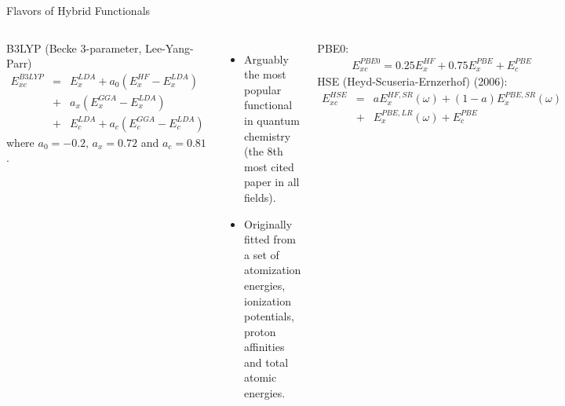 \documentclass[aspectratio=169]{beamer}
\begin{document}
    \begin{frame}{Flavors of Hybrid Functionals}
        \begin{columns}
            B3LYP (Becke 3-parameter, Lee-Yang-Parr)\cite{beckeDensityFunctionalThermochemistry1993}
            \begin{eqnarray*}
                E^{B3LYP}_{xc} & = & E_x^{LDA} + a_0 (E_x^{HF} - E_x^{LDA})\\
                & + & a_x (E_x^{GGA}-E_x^{LDA}) \\
                & +&  E_c^{LDA} +a_c(E_c^{GGA} - E_c^{LDA})
            \end{eqnarray*}
            where $a_0 = -0.2$, $a_x = 0.72$ and $a_c = 0.81$.
            \begin{itemize}
                \item Arguably the most popular functional in quantum chemistry (the 8th most cited paper in all fields).
                \item Originally fitted from a set of atomization energies, ionization potentials, proton affinities and total atomic energies.
            \end{itemize}

            PBE0:
            \begin{eqnarray*}
                E^{PBE0}_{xc} = 0.25E_x^{HF} + 0.75 E_x^{PBE} + E_c^{PBE}
            \end{eqnarray*}
            HSE (Heyd-Scuseria-Ernzerhof) (2006):\cite{heydHybridFunctionalsBased2003,heydErratumHybridFunctionals2006}
            \begin{eqnarray*}
                E^{HSE}_{xc} & = & a E_x^{HF,SR}(\omega) +  (1-a) E_x^{PBE,SR}(\omega) \\
                &+& E_x^{PBE,LR}(\omega) + E_c^{PBE}
            \end{eqnarray*}

            Effectively PBE0, but with an adjustable parameter $\omega$ ($\sim 0.2$) controlling the range of the exchange interaction, aka a \textit{screened} hybrid functional. Works remarkably well for extended systems like solids.
        \end{columns}


    \end{frame}
\end{document}
